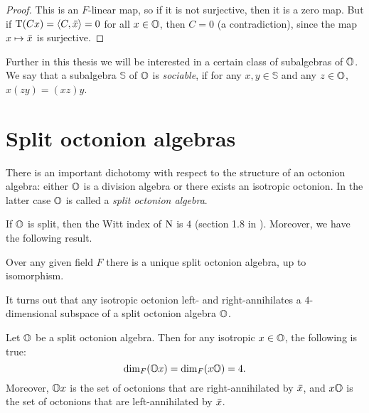 \begin{proof}
	This is an $F$-linear map, so if it is not surjective, then it is a zero map. But if 
	$\operatorname{T}(Cx) = \langle C, \mathord{\mbox{\hspace*{0pt}}\,\overline{\!x\!\!\;}\!\:}\mbox{\hspace*{0pt}} \rangle = 0$ for all $x \in \mathbb{O}$, then $C = 0$ (a contradiction), since the
	map $x \mapsto \mathord{\mbox{\hspace*{0pt}}\,\overline{\!x\!\!\;}\!\:}\mbox{\hspace*{0pt}}$ is surjective. 
\end{proof}

Further in this thesis we will be interested in a certain class of subalgebras of $\mathbb{O}$. We say
that a subalgebra $\mathbb{S}$ of $\mathbb{O}$ is \textit{sociable}, if for any $x,y \in \mathbb{S}$
and any $z \in \mathbb{O}$, $x(zy) = (xz)y$. 

\section{Split octonion algebras}

There is an important dichotomy with respect to the structure of an octonion algebra: 
either $\mathbb{O}$ is a division algebra or there exists an isotropic octonion.
In the latter case $\mathbb{O}$ is called a \textit{split octonion algebra}. 

If $\mathbb{O}$ is split, then the Witt index of $\mathord{\mathrm{N}}$ is $4$ (section 1.8 in \cite{SpringerVeldkamp}).
Moreover, we have the following result.
\begin{theorem}
	\label{theorem:unique_split_algebra}
	Over any given field $F$ there is a unique split octonion algebra, up to isomorphism.
\end{theorem}
It turns out that any isotropic octonion left- and right-annihilates a $4$-dimensional subspace
of a split octonion algebra $\mathbb{O}$. 

\begin{proposition}
	\label{prop:octonion_annihilator}
	Let $\mathbb{O}$ be a split octonion algebra. Then for any isotropic $x \in \mathbb{O}$, the 
	following is true:
	\begin{equation}
		\dim_F(\mathbb{O} x) = \dim_F(x\mathbb{O}) = 4. 
	\end{equation}
	Moreover, $\mathbb{O} x$ is the set of octonions that are right-annihilated by $\mathord{\mbox{\hspace*{0pt}}\,\overline{\!x\!\!\;}\!\:}\mbox{\hspace*{0pt}}$, and
	$x \mathbb{O}$ is the set of octonions that are left-annihilated by $\mathord{\mbox{\hspace*{0pt}}\,\overline{\!x\!\!\;}\!\:}\mbox{\hspace*{0pt}}$.
\end{proposition}

